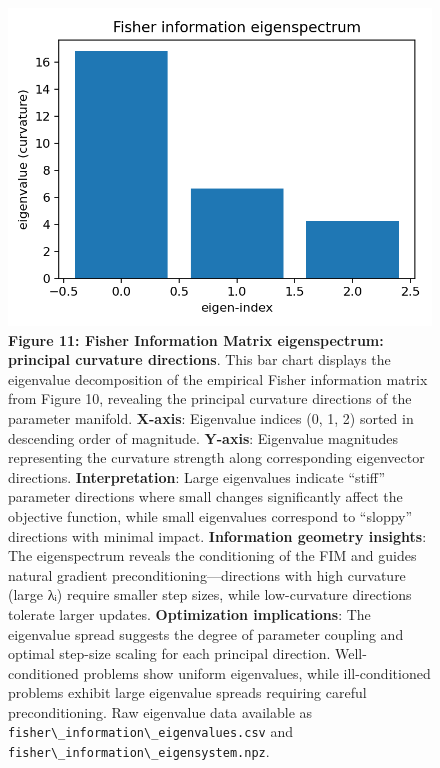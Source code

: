 \documentclass[
  10pt,
]{article}
\newcommand{\passthrough}[1]{#1}
\begin{document}
\begin{figure}
\centering
\includegraphics{../output/figures/fisher_information_eigenspectrum.png}
\caption{\textbf{Figure 11: Fisher Information Matrix eigenspectrum:
principal curvature directions}. This bar chart displays the eigenvalue
decomposition of the empirical Fisher information matrix from Figure 10,
revealing the principal curvature directions of the parameter manifold.
\textbf{X-axis}: Eigenvalue indices (0, 1, 2) sorted in descending order
of magnitude. \textbf{Y-axis}: Eigenvalue magnitudes representing the
curvature strength along corresponding eigenvector directions.
\textbf{Interpretation}: Large eigenvalues indicate ``stiff'' parameter
directions where small changes significantly affect the objective
function, while small eigenvalues correspond to ``sloppy'' directions
with minimal impact. \textbf{Information geometry insights}: The
eigenspectrum reveals the conditioning of the FIM and guides natural
gradient preconditioning---directions with high curvature (large λᵢ)
require smaller step sizes, while low-curvature directions tolerate
larger updates. \textbf{Optimization implications}: The eigenvalue
spread suggests the degree of parameter coupling and optimal step-size
scaling for each principal direction. Well-conditioned problems show
uniform eigenvalues, while ill-conditioned problems exhibit large
eigenvalue spreads requiring careful preconditioning. Raw eigenvalue
data available as
\passthrough{\lstinline!fisher\_information\_eigenvalues.csv!} and
\passthrough{\lstinline!fisher\_information\_eigensystem.npz!}.}
\end{figure}
\end{document}
